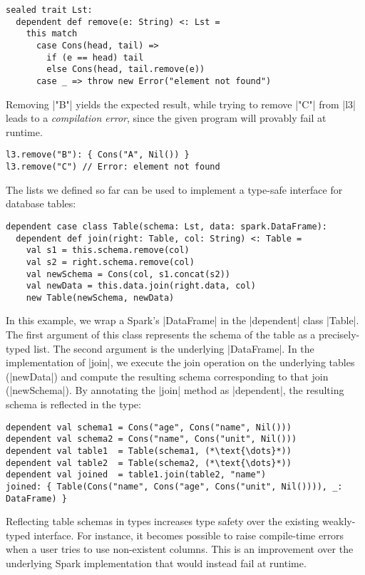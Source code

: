 \begin{lstlisting}
sealed trait Lst:
  dependent def remove(e: String) <: Lst =
    this match
      case Cons(head, tail) =>
        if (e == head) tail
        else Cons(head, tail.remove(e))
      case _ => throw new Error("element not found")
\end{lstlisting}

\noindent
Removing |"B"| yields the expected result, while trying to remove |"C"| from |l3| leads to a \emph{compilation error}, since the given program will provably fail at runtime.

\begin{lstlisting}
l3.remove("B"): { Cons("A", Nil()) }
l3.remove("C") // Error: element not found
\end{lstlisting}

The lists we defined so far can be used to implement a type-safe interface for database tables:

\begin{lstlisting}
dependent case class Table(schema: Lst, data: spark.DataFrame):
  dependent def join(right: Table, col: String) <: Table =
    val s1 = this.schema.remove(col)
    val s2 = right.schema.remove(col)
    val newSchema = Cons(col, s1.concat(s2))
    val newData = this.data.join(right.data, col)
    new Table(newSchema, newData)
\end{lstlisting}

\noindent
In this example, we wrap a Spark's |DataFrame| in the |dependent| class |Table|.
The first argument of this class represents the schema of the table as a precisely-typed list.
The second argument is the underlying |DataFrame|.
In the implementation of |join|, we execute the join operation on the underlying tables (|newData|) and compute the resulting schema corresponding to that join (|newSchema|).
By annotating the |join| method as |dependent|, the resulting schema is reflected in the type:

\begin{lstlisting}
dependent val schema1 = Cons("age", Cons("name", Nil()))
dependent val schema2 = Cons("name", Cons("unit", Nil()))
dependent val table1  = Table(schema1, (*\text{\dots}*))
dependent val table2  = Table(schema2, (*\text{\dots}*))
dependent val joined  = table1.join(table2, "name")
joined: { Table(Cons("name", Cons("age", Cons("unit", Nil()))), _: DataFrame) }
\end{lstlisting}

\noindent
Reflecting table schemas in types increases type safety over the existing weakly-typed interface.
For instance, it becomes possible to raise compile-time errors when a user tries to use non-existent columns.
This is an improvement over the underlying Spark implementation that would instead fail at runtime.

